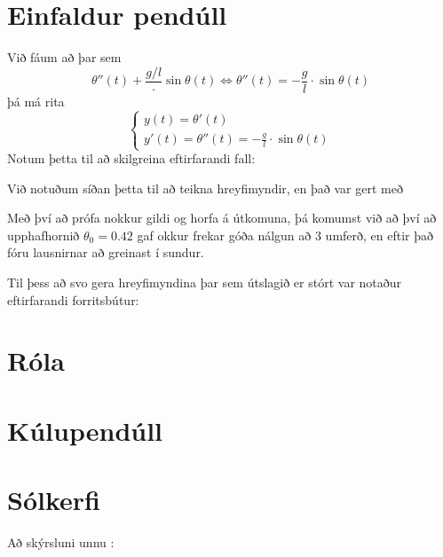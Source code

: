 \documentclass[a4]{article}
\begin{document}
\section{Einfaldur pendúll}
Við fáum að þar sem $$\theta''(t) + \frac{g/l} \cdot \sin{ \theta(t)} \Leftrightarrow \theta''(t) = -\frac{g}{l} \cdot \sin{\theta(t)}$$
  þá má rita $$\left\{ \begin{array}{l} y(t) = \theta'(t) \\ y'(t) = \theta''(t) = - \frac{g}{l} \cdot \sin{\theta(t)} \end{array} \right.$$
Notum þetta til að skilgreina eftirfarandi fall:



Við notuðum síðan þetta til að teikna hreyfimyndir, en það var gert með


Með því að prófa nokkur gildi og horfa á útkomuna, þá komumst við að því að upphafhornið
$\theta_0 = 0.42$ gaf okkur frekar góða nálgun að 3 umferð, en eftir það fóru lausnirnar að greinast í sundur.

Til þess að svo gera hreyfimyndina þar sem útslagið er stórt var notaður eftirfarandi forritsbútur:


\section{Róla}

\section{Kúlupendúll}

\section{Sólkerfi}
\vspace{20 mm}
Að skýrsluni unnu :
\hspace{0.5cm} \makebox[1.5in]{\hrulefill}
\hspace{0.5cm} \makebox[1.5in]{\hrulefill}
\hspace{0.5cm} \makebox[1.5in]{\hrulefill}
\end{document}
